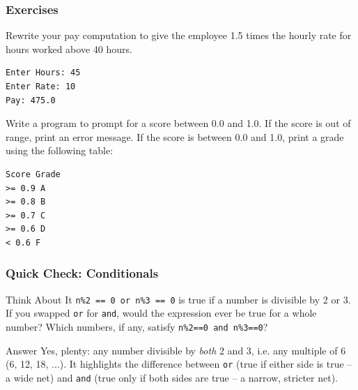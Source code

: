 \begin{frame}[fragile]\frametitle{Exercises}
Rewrite your pay computation to give the employee 1.5 times the
hourly rate for hours worked above 40 hours.
\begin{lstlisting}
Enter Hours: 45
Enter Rate: 10
Pay: 475.0
\end{lstlisting}
Write a program to prompt for a score between 0.0 and 1.0. If the
score is out of range, print an error message. If the score is between 0.0 and 1.0,
print a grade using the following table:
\begin{lstlisting}
Score Grade
>= 0.9 A
>= 0.8 B
>= 0.7 C
>= 0.6 D
< 0.6 F
\end{lstlisting}

\end{frame}

\begin{frame}[fragile]\frametitle{Quick Check: Conditionals}
\begin{block}{Think About It}
\texttt{n\%2 == 0 or n\%3 == 0} is true if a number is divisible by 2 or 3. If you swapped \texttt{or} for \texttt{and}, would the expression ever be true for a whole number? Which numbers, if any, satisfy \texttt{n\%2==0 and n\%3==0}?
\end{block}
\pause
\begin{block}{Answer}
Yes, plenty: any number divisible by \emph{both} 2 and 3, i.e. any multiple of 6 (6, 12, 18, ...). It highlights the difference between \texttt{or} (true if either side is true -- a wide net) and \texttt{and} (true only if both sides are true -- a narrow, stricter net).
\end{block}
\end{frame}



